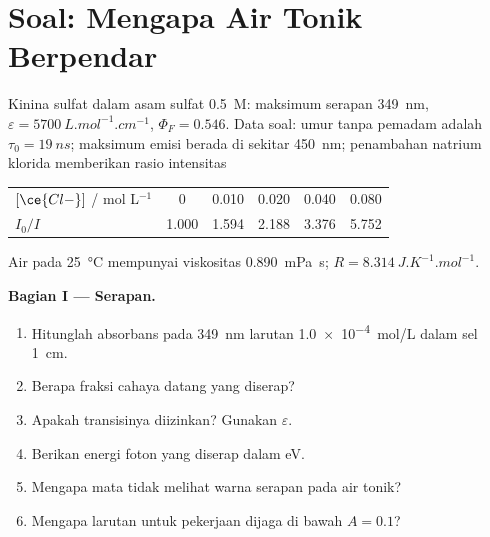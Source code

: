 \section{Soal: Mengapa Air Tonik Berpendar}

\begin{problem}
\label{pb:b3:electronic-spectroscopy:1}
Kinina sulfat dalam asam sulfat \qty{0.5}{M}: maksimum serapan \qty{349}{nm},
$\varepsilon = \qty{5700}{L.mol^{-1}.cm^{-1}}$, $\Phi_F = 0.546$. Data soal:
umur  tanpa pemadam adalah $\tau_0 = \qty{19}{ns}$; maksimum emisi
berada di sekitar \qty{450}{nm}; penambahan natrium klorida memberikan rasio
intensitas
\begin{center}\small
\begin{tabular}{lccccc}
\hline
$[\ce{Cl-}]$ / mol L$^{-1}$ & 0 & 0.010 & 0.020 & 0.040 & 0.080 \\
$I_0/I$ & 1.000 & 1.594 & 2.188 & 3.376 & 5.752 \\ \hline
\end{tabular}
\end{center}
Air pada \qty{25}{\celsius} mempunyai viskositas \qty{0.890}{mPa.s}; $R =
\qty{8.314}{J.K^{-1}.mol^{-1}}$.

\medskip\noindent\textbf{Bagian I --- Serapan.}
\begin{enumerate}[beginpenalty=10000]
  \item Hitunglah absorbans pada \qty{349}{nm} larutan \qty{1.0e-4}{mol/L}
        dalam sel \qty{1}{cm}.
  \item Berapa fraksi cahaya datang yang diserap?
  \item Apakah transisinya diizinkan? Gunakan $\varepsilon$.
  \item Berikan energi foton yang diserap dalam eV.
  \item Mengapa mata tidak melihat warna serapan pada air tonik?
  \item Mengapa larutan untuk pekerjaan  dijaga di bawah
        $A = 0.1$?
\end{enumerate}


\end{problem}
